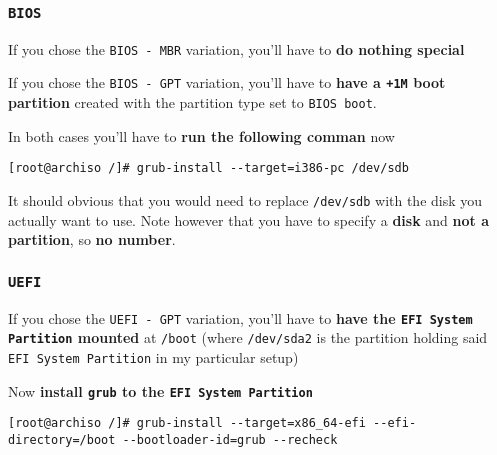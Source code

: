 \documentclass[9pt]{report}
\newenvironment{NOTE}
{\begin{tcolorbox}[colback=admonitionBG,coltitle=draculaFG,colframe=draculaBlue,colbacktitle=draculaBlue,title=NOTE]}
{\end{tcolorbox}}
\begin{document}
\newpage

\hypertarget{x-bios}{\subsubsection{\texttt{BIOS}}}
If you chose the \texttt{BIOS - MBR} variation, you’ll have to \textbf{do nothing special}


If you chose the \texttt{BIOS - GPT} variation, you’ll have to \textbf{have a \texttt{+1M} boot partition} created with the partition type set to \texttt{BIOS boot}.


In both cases you’ll have to \textbf{run the following comman} now


\begin{verbatim}
[root@archiso /]# grub-install --target=i386-pc /dev/sdb
\end{verbatim}

\begin{NOTE}
    It should obvious that you would need to replace \texttt{/dev/sdb} with the disk you actually want to use.
    Note however that you have to specify a \textbf{disk} and \textbf{not a partition}, so \textbf{no number}.

\end{NOTE}

\newpage

\hypertarget{x-uefi}{\subsubsection{\texttt{UEFI}}}
If you chose the \texttt{UEFI - GPT} variation, you’ll have to \textbf{have the \texttt{EFI System Partition} mounted} at \texttt{/boot} (where \texttt{/dev/sda2} is the partition holding said \texttt{EFI System Partition} in my particular setup)


Now \textbf{install \texttt{grub} to the \texttt{EFI System Partition}}


\begin{verbatim}
[root@archiso /]# grub-install --target=x86_64-efi --efi-directory=/boot --bootloader-id=grub --recheck
\end{verbatim}
\end{document}
